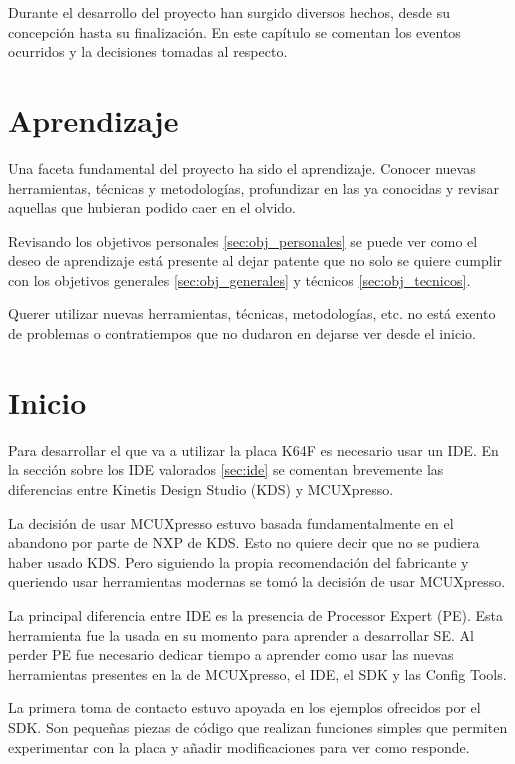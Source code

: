 Durante el desarrollo del proyecto han surgido diversos hechos, desde su
concepción hasta su finalización. En este capítulo se comentan los eventos
ocurridos y la decisiones tomadas al respecto.

\section{Aprendizaje}{\label{sec:aprendizaje}}
Una faceta fundamental del proyecto ha sido el aprendizaje. Conocer nuevas 
herramientas, técnicas y metodologías, profundizar en las ya conocidas y revisar
aquellas que hubieran podido caer en el olvido.

Revisando los objetivos personales \ref{sec:obj_personales} se puede ver como
el deseo de aprendizaje está presente al dejar patente que no solo se quiere
cumplir con los objetivos generales \ref{sec:obj_generales} y técnicos 
\ref{sec:obj_tecnicos}.

Querer utilizar nuevas herramientas, técnicas, metodologías, etc. no está exento
de problemas o contratiempos que no dudaron en dejarse ver desde el inicio.

\section{Inicio}{\label{sec:inicio}}
Para desarrollar el  que va a utilizar la placa K64F
es necesario usar un IDE. En la sección sobre los IDE valorados \ref{sec:ide}
se comentan brevemente las diferencias entre Kinetis Design Studio (KDS) y
MCUXpresso.

La decisión de usar MCUXpresso estuvo basada fundamentalmente en el abandono
por parte de NXP de KDS. Esto no quiere decir que no se pudiera haber usado KDS.
Pero siguiendo la propia recomendación del fabricante y queriendo usar
herramientas modernas se tomó la decisión de usar MCUXpresso.

La principal diferencia entre IDE es la presencia de Processor Expert (PE).
Esta herramienta fue la usada en su momento para aprender a desarrollar SE.
Al perder PE fue necesario dedicar tiempo a aprender como usar las nuevas
herramientas presentes en la  de MCUXpresso, el IDE, el
SDK y las Config Tools.

La primera toma de contacto estuvo apoyada en los ejemplos ofrecidos por el SDK.
Son pequeñas piezas de código que realizan funciones simples que permiten
experimentar con la placa y añadir modificaciones para ver como responde.

